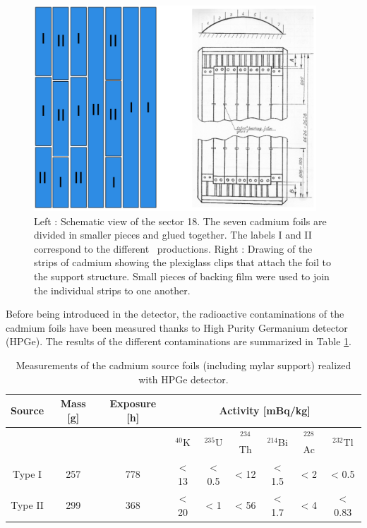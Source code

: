 \documentclass[main.tex]{subfiles}
\begin{document}
\bigskip


\begin{figure}[h!]
\includegraphics[height=7.7cm]{pictures/Chap6/schemaFoil_v2.pdf}
\centering
\caption{Left : Schematic view of the sector 18. The seven cadmium foils are divided in smaller pieces and glued together. The labels I and II correspond to the different \Cd~productions. Right : Drawing of the strips of cadmium showing the plexiglass clips that attach the foil to the support structure. Small pieces of backing film were used to join the individual strips to one another.}
\label{CdFoil}
\end{figure}


\NI Before being introduced in the detector, the radioactive contaminations of the cadmium foils have been measured thanks to High Purity Germanium detector (HPGe). The results of the different contaminations are summarized in Table \ref{TableContaminationMeasurements}.


\bigskip


\begin{table}[h!]
\begin{center}
\begin{tabular}{c|c|c|c|c|c|c|c|c}
   \toprule
   Source  & Mass [g] & Exposure [h] &\multicolumn{6}{c|}{Activity [mBq/kg]} \\
   \hline
           &          &              & $^{\text{40}}$K &  $^{\text{235}}$U &  $^{\text{234}}$Th & $^{\text{214}}$Bi  & $^{\text{228}}$Ac & $^{\text{232}}$Tl \\[0.1cm]
   Type I  & 257      & 778          & < 13     & < 0.5      & < 12        & < 1.5                  & < 2        & < 0.5 \\
   Type II & 299      & 368          & < 20     & < 1        & < 56        & < 1.7                  & < 4        & < 0.83 \\
   \bottomrule
\end{tabular}
\caption{Measurements of the cadmium source foils (including mylar support) realized with HPGe detector.}
\label{TableContaminationMeasurements}
\end{center}
\end{table}
\end{document}
